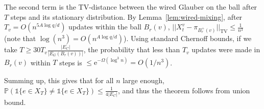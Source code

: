 \documentclass[11pt]{article}
\theoremstyle{plain}
\newcommand{\emm}{\mathrm{e}}
\renewcommand{\P}{\mathds{P}}
\newcommand{\TV}{\mathrm{TV}}
\newcommand{\1}{\mathbb{1}}
\begin{document}
The second term is the TV-distance between the wired Glauber on the ball after \(T\) steps and its stationary distribution. By Lemma~\ref{lem:wired-mixing}, after \(T_v = O(n^{5A\log q/d})\) updates within the ball \(B_r(v)\), \(||X_t^v-\pi_{B_r^+(v)}||_\TV\leq \tfrac{1}{n^{3}}\) (note that \(\log (n^3) = O(n^{A\log q/d})\)). Using standard Chernoff bounds, if we take \(T \geq 30 T_v \frac{|E_C|}{|E_G(B_r(v))|}\), the probability that less than \(T_v\) updates were made in \(B_r(v)\) within \(T\) steps is \(\leq \emm^{-\Omega(\log^3 n)} = O(1/n^3)\).

Summing up, this gives that for all \(n\) large enough, \(\P(\1\{e\in X_T\}\neq \1\{e\in X_T\})\leq \frac{1}{4|E_C|}\), and thus the theorem follows from union bound.
\end{document}
